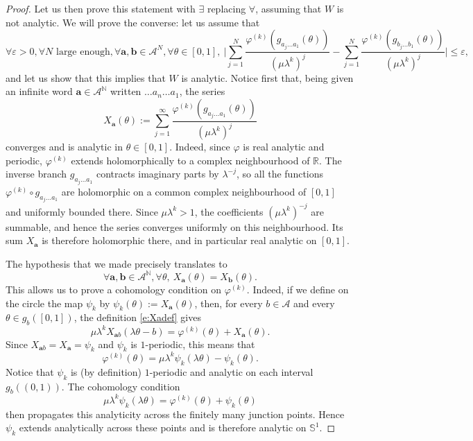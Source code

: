\documentclass[11pt]{amsart}
\theoremstyle{plain}
\theoremstyle{definition}
\numberwithin{equation}{section}
\begin{document}
\begin{proof}
Let us then prove this statement with $\exists$ replacing $\forall$, assuming that $W$ is not analytic. We will prove the converse: let us assume that
$$ \forall \varepsilon>0, \forall N \text{ large enough}, \forall \mathbf{a},\mathbf{b} \in \mathcal{A}^N, \forall \theta \in [0,1],\ \Big|\sum_{j=1}^{N} \frac{ \varphi^{(k)}(g_{a_j \dots a_1}(\theta))}{(\mu \lambda^k)^j} - \sum_{j=1}^{N} \frac{ \varphi^{(k)}(g_{b_j \dots b_1}(\theta))}{(\mu \lambda^k)^j}\Big| \leq \varepsilon, $$
and let us show that this implies that $W$ is analytic. Notice first that, being given an infinite word $\mathbf{a} \in \mathcal{A}^\mathbb{N}$ written $\dots a_n \dots a_1$, the series 
\begin{equation}\label{e:Xadef}
X_\mathbf{a}(\theta) := \sum_{j=1}^\infty \frac{\varphi^{(k)}(g_{a_j \dots a_1}(\theta))}{(\mu \lambda^k)^j}
\end{equation}
converges and is analytic in $\theta \in [0,1]$. Indeed, since $\varphi$ is real analytic and periodic, $\varphi^{(k)}$ extends holomorphically to a complex neighbourhood of $\mathbb R$. The inverse branch $g_{a_j\dots a_1}$ contracts imaginary parts by $\lambda^{-j}$, so all the functions $\varphi^{(k)}\circ g_{a_j\dots a_1}$ are holomorphic on a common complex neighbourhood of $[0,1]$ and uniformly bounded there. Since $\mu\lambda^k>1$, the coefficients $(\mu\lambda^k)^{-j}$ are summable, and hence the series converges uniformly on this neighbourhood. Its sum $X_{\mathbf a}$ is therefore holomorphic there, and in particular real analytic on $[0,1]$.

The hypothesis that we made precisely translates to
$$ \forall \mathbf{a},\mathbf{b} \in \mathcal{A}^\mathbb{N}, \forall \theta, \ X_\mathbf{a}(\theta) = X_{\mathbf{b}}(\theta). $$
This allows us to prove a cohomology condition on $\varphi^{(k)}$. Indeed, if we define on the circle the map $\psi_k$ by $\psi_k(\theta) := X_\mathbf{a}(\theta)$, then, for every $b\in\mathcal A$ and every $\theta\in g_b([0,1])$, the definition \eqref{e:Xadef} gives
$$ \mu\lambda^k X_{\mathbf a b}(\lambda\theta-b)=\varphi^{(k)}(\theta)+X_\mathbf a(\theta). $$
Since $X_{\mathbf a b}=X_\mathbf a=\psi_k$ and $\psi_k$ is $1$-periodic, this means that
$$ \varphi^{(k)}(\theta) = \mu \lambda^k \psi_k(\lambda \theta) - \psi_k(\theta). $$
Notice that $\psi_k$ is (by definition) $1$-periodic and analytic on each interval $g_b((0,1))$. The cohomology condition
$$ \mu\lambda^k\psi_k(\lambda\theta)=\varphi^{(k)}(\theta)+\psi_k(\theta) $$
then propagates this analyticity across the finitely many junction points. Hence $\psi_k$ extends analytically across these points and is therefore analytic on $\mathbb S^1$.


\end{proof}
\end{document}
